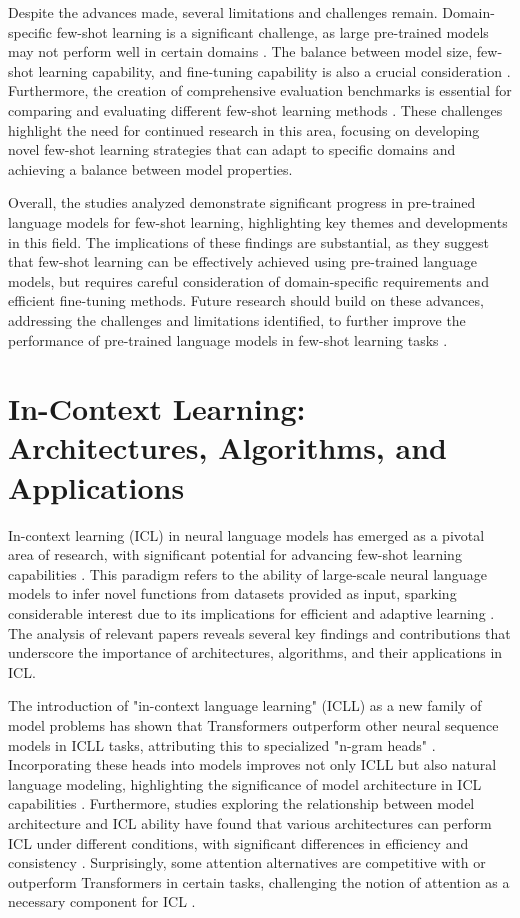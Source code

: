 \documentclass[conference]{IEEEtran}
\begin{document}
Despite the advances made, several limitations and challenges remain. Domain-specific few-shot learning is a significant challenge, as large pre-trained models may not perform well in certain domains \cite{b3}. The balance between model size, few-shot learning capability, and fine-tuning capability is also a crucial consideration \cite{b4}. Furthermore, the creation of comprehensive evaluation benchmarks is essential for comparing and evaluating different few-shot learning methods \cite{b6}. These challenges highlight the need for continued research in this area, focusing on developing novel few-shot learning strategies that can adapt to specific domains and achieving a balance between model properties.

Overall, the studies analyzed demonstrate significant progress in pre-trained language models for few-shot learning, highlighting key themes and developments in this field. The implications of these findings are substantial, as they suggest that few-shot learning can be effectively achieved using pre-trained language models, but requires careful consideration of domain-specific requirements and efficient fine-tuning methods. Future research should build on these advances, addressing the challenges and limitations identified, to further improve the performance of pre-trained language models in few-shot learning tasks \cite{b1} \cite{b8}.

\section{In-Context Learning: Architectures, Algorithms, and Applications}
In-context learning (ICL) in neural language models has emerged as a pivotal area of research, with significant potential for advancing few-shot learning capabilities \cite{b1}. This paradigm refers to the ability of large-scale neural language models to infer novel functions from datasets provided as input, sparking considerable interest due to its implications for efficient and adaptive learning \cite{b2}. The analysis of relevant papers reveals several key findings and contributions that underscore the importance of architectures, algorithms, and their applications in ICL.

The introduction of "in-context language learning" (ICLL) as a new family of model problems has shown that Transformers outperform other neural sequence models in ICLL tasks, attributing this to specialized "n-gram heads" \cite{b3}. Incorporating these heads into models improves not only ICLL but also natural language modeling, highlighting the significance of model architecture in ICL capabilities \cite{b4}. Furthermore, studies exploring the relationship between model architecture and ICL ability have found that various architectures can perform ICL under different conditions, with significant differences in efficiency and consistency \cite{b5}. Surprisingly, some attention alternatives are competitive with or outperform Transformers in certain tasks, challenging the notion of attention as a necessary component for ICL \cite{b6}.
\end{document}

